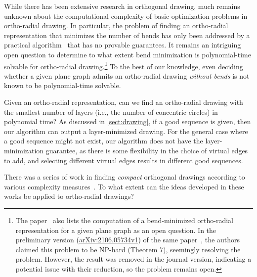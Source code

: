 \documentclass{theoretics}
\begin{document}
 

While there has been extensive research in orthogonal drawing, much remains unknown about the computational complexity of basic optimization problems in ortho-radial drawing. In particular, the problem of finding an ortho-radial representation that minimizes the number of bends has only been addressed by a practical algorithm~\cite{niedermann2020integer} that has no provable guarantees. It remains an intriguing open question to determine to what extent bend minimization is polynomial-time solvable for ortho-radial drawing.\footnote{The paper~\cite{barth2023topology} also lists the computation of a bend-minimized ortho-radial representation for a given plane graph as an open question. In the preliminary version (\href{https://arxiv.org/abs/2106.05734v1}{arXiv:2106.05734v1}) of the same paper~\cite{barth2023topology}, the authors claimed this problem to be NP-hard (Theorem 7), seemingly resolving the problem. However, the result was removed in the journal version, indicating a potential issue with their reduction, so the problem remains open.} To the best of our knowledge, even deciding whether a given plane graph admits an ortho-radial drawing \emph{without bends} is not known to be polynomial-time solvable.


Given an ortho-radial representation, can we find an ortho-radial drawing with the smallest number of layers (i.e., the number of concentric circles) in polynomial time? As discussed in \cref{sect:drawing}, if a good sequence is given, then our algorithm can output a layer-minimized drawing. For the general case where a good sequence might not exist, our algorithm does not have the layer-minimization guarantee, as there is some flexibility in the choice of virtual edges to add, and selecting different virtual edges results in different good sequences. 

There was a series of work in finding \emph{compact} orthogonal drawings according to various complexity measures~\cite{JGAA-595,bridgeman2000turn,JGAA-263,klau1999optimal,patrignani2001complexity}. To what extent can the ideas developed in these works be applied to ortho-radial drawings?


\printbibliography

\appendix
\end{document}
